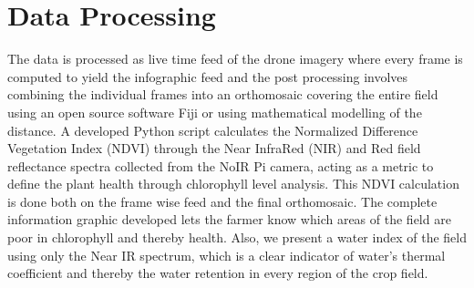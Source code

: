 \section{Data Processing} The data is processed as live time feed of the drone imagery where every frame is computed to yield the infographic feed and the post processing involves combining the individual frames into an orthomosaic covering the entire field using an open source software Fiji or using mathematical modelling of the distance. A developed Python script calculates the Normalized Difference Vegetation Index (NDVI) through the Near InfraRed (NIR) and Red field reflectance spectra collected from the NoIR Pi camera, acting as a metric to define the plant health through chlorophyll level analysis. This NDVI calculation is done both on the frame wise feed and the final orthomosaic. The complete information graphic developed lets the farmer know which areas of the field are poor in chlorophyll and thereby health. Also, we present a water index of the field using only the Near IR spectrum, which is a clear indicator of water's thermal coefficient and thereby the water retention in every region of the crop field. 




